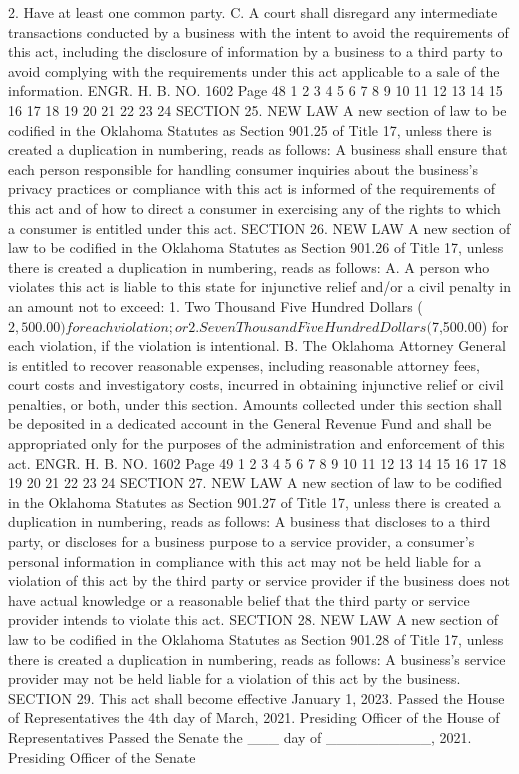 2. Have at least one common party.
C. A court shall disregard any intermediate transactions
conducted by a business with the intent to avoid the requirements of
this act, including the disclosure of information by a business to a
third party to avoid complying with the requirements under this act
applicable to a sale of the information.
ENGR. H. B. NO. 1602 Page 48
1
2
3
4
5
6
7
8
9
10
11
12
13
14
15
16
17
18
19
20
21
22
23
24
SECTION 25. NEW LAW A new section of law to be codified
in the Oklahoma Statutes as Section 901.25 of Title 17, unless there
is created a duplication in numbering, reads as follows:
A business shall ensure that each person responsible for
handling consumer inquiries about the business's privacy practices
or compliance with this act is informed of the requirements of this
act and of how to direct a consumer in exercising any of the rights
to which a consumer is entitled under this act.
SECTION 26. NEW LAW A new section of law to be codified
in the Oklahoma Statutes as Section 901.26 of Title 17, unless there
is created a duplication in numbering, reads as follows:
A. A person who violates this act is liable to this state for
injunctive relief and/or a civil penalty in an amount not to exceed:
1. Two Thousand Five Hundred Dollars ($2,500.00) for each
violation; or
2. Seven Thousand Five Hundred Dollars ($7,500.00) for each
violation, if the violation is intentional.
B. The Oklahoma Attorney General is entitled to recover
reasonable expenses, including reasonable attorney fees, court costs
and investigatory costs, incurred in obtaining injunctive relief or
civil penalties, or both, under this section. Amounts collected
under this section shall be deposited in a dedicated account in the
General Revenue Fund and shall be appropriated only for the purposes
of the administration and enforcement of this act.
ENGR. H. B. NO. 1602 Page 49
1
2
3
4
5
6
7
8
9
10
11
12
13
14
15
16
17
18
19
20
21
22
23
24
SECTION 27. NEW LAW A new section of law to be codified
in the Oklahoma Statutes as Section 901.27 of Title 17, unless there
is created a duplication in numbering, reads as follows:
A business that discloses to a third party, or discloses for a
business purpose to a service provider, a consumer's personal
information in compliance with this act may not be held liable for a
violation of this act by the third party or service provider if the
business does not have actual knowledge or a reasonable belief that
the third party or service provider intends to violate this act.
SECTION 28. NEW LAW A new section of law to be codified
in the Oklahoma Statutes as Section 901.28 of Title 17, unless there
is created a duplication in numbering, reads as follows:
A business's service provider may not be held liable for a
violation of this act by the business.
SECTION 29. This act shall become effective January 1, 2023.
Passed the House of Representatives the 4th day of March, 2021.
Presiding Officer of the House
of Representatives
Passed the Senate the ___ day of __________, 2021.
Presiding Officer of the Senate